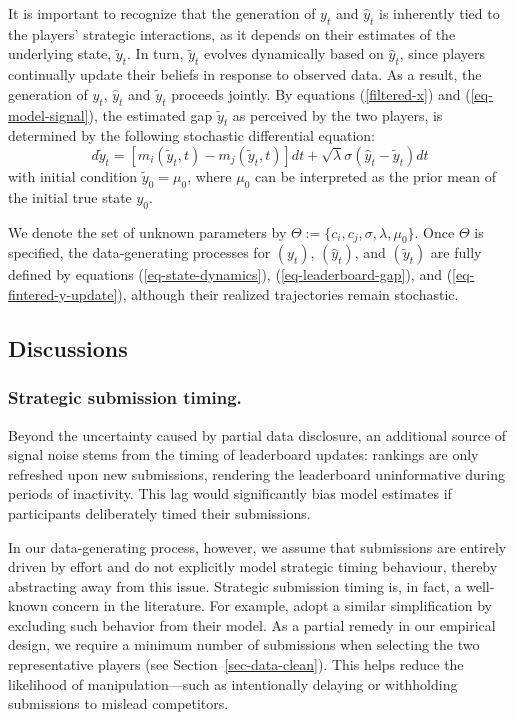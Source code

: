 \documentclass[mnsc]{informs3}
\begin{document}
It is important to recognize that the generation of $y_t$ and $\hat{y}_t$ is inherently tied to the players’ strategic interactions, as it depends on their estimates of the underlying state, $\tilde{y}_t$. 
In turn, $\tilde{y}_t$ evolves dynamically based on $\hat{y}_t$, since players continually update their beliefs in response to observed data. 
As a result, the generation of $y_t$, $\hat{y}_t$ and $\tilde{y}_t$ proceeds jointly.
By equations (\ref{filtered-x}) and (\ref{eq-model-signal}), the estimated gap $\tilde{y}_t$ as perceived by the two players, is determined by the following stochastic differential equation:
\begin{equation}\label{eq-fintered-y-update}
d\tilde{y}_{t} = \left[m_i(\tilde{y}_t, t) - m_j(\tilde{y}_t, t)\right]dt + \sqrt{\lambda}\sigma(\hat{y}_t-\tilde{y}_{t}) dt
\end{equation}
with initial condition $\tilde{y}_0 = \mu_0$, where $\mu_0$ can be interpreted as the prior mean of the initial true state $y_0$.

We denote the set of unknown parameters by $\Theta := \{c_i, c_j, \sigma, \lambda, \mu_0\}$.
Once $\Theta$ is specified, the data-generating processes for $(y_t)$, $(\hat{y}_t)$, and $(\tilde{y}_t)$ are fully defined by equations (\ref{eq-state-dynamics}), (\ref{eq-leaderboard-gap}), and (\ref{eq-fintered-y-update}), although their realized trajectories remain stochastic.



\subsection{Discussions}

\subsubsection{Strategic submission timing.}

Beyond the uncertainty caused by partial data disclosure, an additional source of signal noise stems from the timing of leaderboard updates: rankings are only refreshed upon new submissions, rendering the leaderboard uninformative during periods of inactivity.
This lag would significantly bias model estimates if participants deliberately timed their submissions. 


In our data-generating process, however, we assume that submissions are entirely driven by effort and do not explicitly model strategic timing behaviour, thereby abstracting away from this issue.
Strategic submission timing is, in fact, a well-known concern in the literature. 
For example, \citet{lemus2021dynamic} adopt a similar simplification by excluding such behavior from their model.
As a partial remedy in our empirical design, we require a minimum number of submissions when selecting the two representative players (see Section~\ref{sec-data-clean}).
This helps reduce the likelihood of manipulation—such as intentionally delaying or withholding submissions to mislead competitors.
\end{document}
